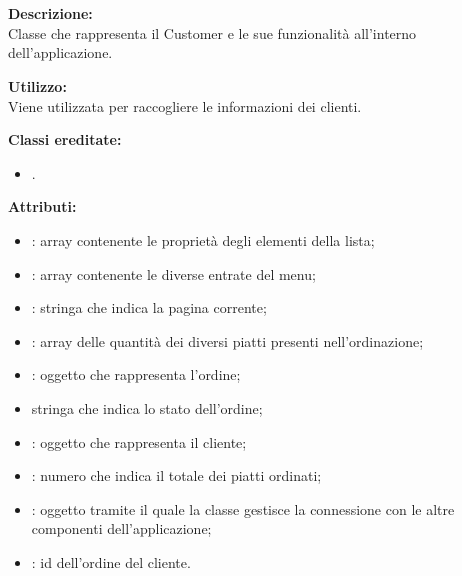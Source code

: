 \paragraph[::CustomerBubble]{\class}\mbox{}\\ \label{\class}
\textbf{Descrizione:}\\
Classe che rappresenta il Customer e le sue funzionalità all'interno dell'applicazione.

\textbf{Utilizzo:}\\
Viene utilizzata per raccogliere le informazioni dei clienti.

\textbf{Classi ereditate:}
\begin{itemize}
	\item {}.
\end{itemize}


\textbf{Attributi:}
\begin{itemize}
	\item {}: array contenente le proprietà degli elementi della lista;
	\item {}: array contenente le diverse entrate del menu;
	\item {}: stringa che indica la pagina corrente;
	\item {}: array delle quantità dei diversi piatti presenti nell'ordinazione;
	\item {}: oggetto che rappresenta l'ordine;
	\item {} stringa che indica lo stato dell'ordine;
	\item {}: oggetto che rappresenta il cliente;
	\item {}: numero che indica il totale dei piatti ordinati;
	\item {}: oggetto tramite il quale la classe gestisce la connessione con le altre componenti dell'applicazione;
	\item {}: id dell'ordine del cliente.
\end{itemize}


